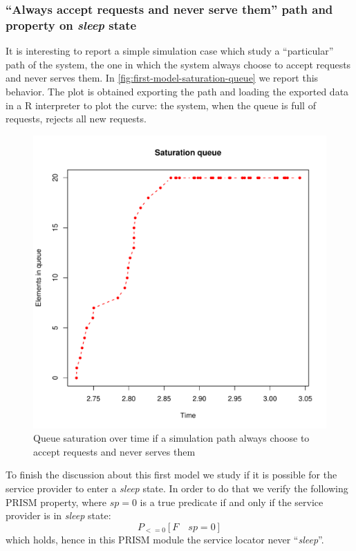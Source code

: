 \subsubsection{``Always accept requests and never serve them'' path
  and property on \emph{sleep} state}

It is interesting to report a simple simulation case which study a
``particular'' path of the system, the one in which the system always
choose to accept requests and never serves them. In
\autoref{fig:first-model-saturation-queue} we report this
behavior. The plot is obtained exporting the path and loading the
exported data in a R interpreter to plot the curve: the system, when
the queue is full of requests, rejects all new requests.
\begin{figure}[htb]
  \centering
  \includegraphics[width=13cm]{quantitative-project/r-project/saturation-queue.pdf}
  \caption{Queue saturation over time if a simulation path always
    choose to accept requests and never serves them}
  \label{fig:first-model-saturation-queue}
\end{figure}

To finish the discussion about this first model we study if it is
possible for the service provider to enter a \emph{sleep} state. In
order to do that we verify the following PRISM property, where $sp=0$
is a true predicate if and only if the service provider is in
\emph{sleep} state:
\begin{displaymath}
  P_{<=0} [ F\quad sp=0 ]
\end{displaymath}
which holds, hence in this PRISM module the service locator never
``\emph{sleep}''.

